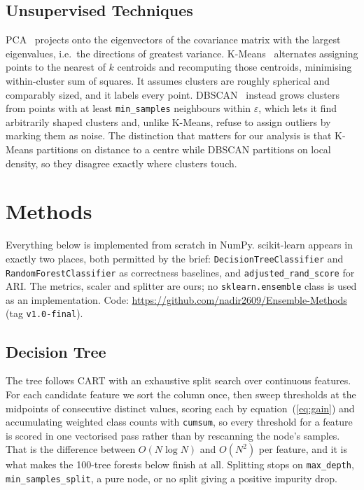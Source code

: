 \documentclass[conference]{IEEEtran}
\begin{document}
\subsection{Unsupervised Techniques}
PCA~\cite{pearson1901lines} projects onto the eigenvectors of the
covariance matrix with the largest eigenvalues, i.e.\ the directions of
greatest variance.  K-Means~\cite{lloyd1982least} alternates assigning
points to the nearest of $k$ centroids and recomputing those centroids,
minimising within-cluster sum of squares.  It assumes clusters are roughly
spherical and comparably sized, and it labels every point.
DBSCAN~\cite{ester1996density} instead grows clusters from points with at
least \texttt{min\_samples} neighbours within $\varepsilon$, which lets it
find arbitrarily shaped clusters and, unlike K-Means, refuse to assign
outliers by marking them as noise.  The distinction that matters for our
analysis is that K-Means partitions on distance to a centre while DBSCAN
partitions on local density, so they disagree exactly where clusters touch.

\section{Methods}
\label{sec:methods}
Everything below is implemented from scratch in NumPy.  scikit-learn
appears in exactly two places, both permitted by the brief:
\texttt{DecisionTreeClassifier} and \texttt{RandomForestClassifier} as
correctness baselines, and \texttt{adjusted\_rand\_score} for ARI.  The
metrics, scaler and splitter are ours; no \texttt{sklearn.ensemble} class
is used as an implementation.  Code:
\url{https://github.com/nadir2609/Ensemble-Methods} (tag
\texttt{v1.0-final}).

\subsection{Decision Tree}
The tree follows CART with an exhaustive split search over continuous
features.  For each candidate feature we sort the column once, then sweep
thresholds at the midpoints of consecutive distinct values, scoring each by
equation~(\ref{eq:gain}) and accumulating weighted class counts with
\texttt{cumsum}, so every threshold for a feature is scored in one
vectorised pass rather than by rescanning the node's samples.  That is the
difference between $O(N \log N)$ and $O(N^2)$ per feature, and it is what
makes the 100-tree forests below finish at all.  Splitting stops on
\texttt{max\_depth}, \texttt{min\_samples\_split}, a pure node, or no split
giving a positive impurity drop.
\end{document}
